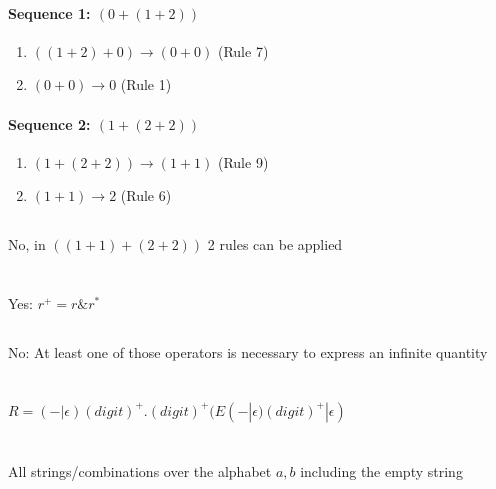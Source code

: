 \documentclass{article}
\begin{document}
      \paragraph{Sequence 1: $(0+(1+2))$}
        \begin{enumerate}
          \item $ ((1+2) + 0) \rightarrow (0 + 0) $ (Rule 7)
          \item $ (0 + 0) \rightarrow 0 $ (Rule 1) 
        \end{enumerate}
      \paragraph{Sequence 2: $(1+(2+2))$}
        \begin{enumerate}
          \item $ (1 + (2 + 2)) \rightarrow (1 + 1) $ (Rule 9)
          \item $ (1 + 1) \rightarrow 2 $ (Rule 6)
        \end{enumerate}
  \subsection{}
    No, in $ ((1 + 1) + (2+2)) $ 2 rules can be applied

\section{}
    \subsection{}
      Yes: $ r^+ = r\&r^* $
    \subsection{}
      No: At least one of those operators is necessary to express an
      infinite quantity
\section{}
  $ R = (- | \epsilon)(digit)^+.(digit)^+(E(- | \epsilon)(digit)^+ | \epsilon) $

\section{}
  \subsection{}
    All strings/combinations over the alphabet $ {a,b} $ including the empty string
\end{document}
